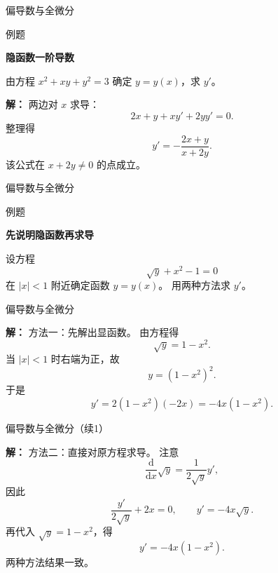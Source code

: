 \documentclass[aspectratio=169,10pt,fontset=fandol]{ctexbeamer}
\newcommand{\dd}{\mathrm{d}}
\begin{document}
\begin{frame}[t,fragile]{偏导数与全微分}
\normalsize
\begin{block}{例题}
{\normalsize
\textbf{隐函数一阶导数}\par

	由方程 $x^2+xy+y^2=3$ 确定 $y=y(x)$，求 $y'$。

}
\end{block}
\pause
{\normalsize
\textbf{解：}
两边对 $x$ 求导：
	\[
	2x+y+xy'+2yy'=0.
	\]
	整理得
	\[
	y'=-\frac{2x+y}{x+2y}.
	\]
	该公式在 $x+2y\neq0$ 的点成立。

}
\end{frame}
\begin{frame}[t,fragile]{偏导数与全微分}
\footnotesize
\begin{block}{例题}
{\footnotesize
\textbf{先说明隐函数再求导}\par

	设方程
	\[
	\sqrt{y}+x^2-1=0
	\]
	在 $|x|<1$ 附近确定函数 $y=y(x)$。 用两种方法求 $y'$。

}
\end{block}
\end{frame}
\begin{frame}[t,fragile]{偏导数与全微分}
\footnotesize
{\footnotesize
\textbf{解：}
方法一：先解出显函数。 由方程得
	\[
	\sqrt{y}=1-x^2.
	\]
	当 $|x|<1$ 时右端为正，故
	\[
	y=(1-x^2)^2.
	\]
	于是
	\[
	y'=2(1-x^2)(-2x)=-4x(1-x^2).
	\]
	

}
\end{frame}
\begin{frame}[t,fragile]{偏导数与全微分（续1）}
\footnotesize
{\footnotesize
\textbf{解：}
	方法二：直接对原方程求导。 注意
	\[
	\frac{\dd}{\dd x}\sqrt{y}
	=\frac{1}{2\sqrt{y}}y',
	\]
	因此
	\[
	\frac{y'}{2\sqrt{y}}+2x=0,
	\qquad
	y'=-4x\sqrt{y}.
	\]
	再代入 $\sqrt{y}=1-x^2$，得
	\[
	y'=-4x(1-x^2).
	\]
	两种方法结果一致。

}
\end{frame}
\end{document}
